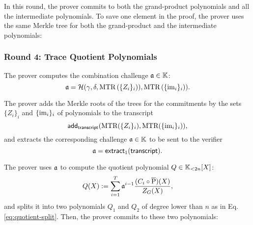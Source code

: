 In this round, the prover commits to both the grand-product polynomials and all the intermediate polynomials. To save one element in the proof, the prover uses the same Merkle tree for both the grand-product and the intermediate polynomials:



\subsubsection*{Round 4: Trace Quotient Polynomials}

\ifNOPOLYGON
The prover computes the combination challenge $\mathfrak{a} \in \mathbb{K}$:
\[
  \mathfrak{a} = \mathcal{H}(\gamma,\delta,\text{MTR}\left(\{Z_i\}_i\right)),\text{MTR}\left(\{\text{im}_i\}_i\right)).
\]
\fi

\ifPOLYGON
The prover adds the Merkle roots of the trees for the commitments by the sets $\{Z_i\}_i$ and $\{\text{im}_i\}_i$ of polynomials to the transcript
\[
\textsf{add}_{\textsf{transcript}}(\text{MTR}(\{Z_i\}_i), \text{MTR}(\{\text{im}_i\}_i)),
\]
and extracts the corresponding challenge $\mathfrak{a} \in \mathbb{K}$ to be sent to the verifier
\[
\mathfrak{a} = \mathsf{extract}_{1}(\textsf{transcript}).
\]
\fi

The prover uses $\mathfrak{a}$ to compute the quotient polynomial $Q \in \mathbb{K}_{<2n}[X]$: 
\[
  Q(X) := \sum_{i=1}^T \mathfrak{a}^{i-1} \frac{(C_i \circ \overline{\text{P}})(X)}{Z_G(X)},
\]
and splits it into two polynomials $Q_1$ and $Q_2$ of degree lower than $n$ as in Eq. \eqref{eq:quotient-split}. Then, the prover commits to these two polynomials:

